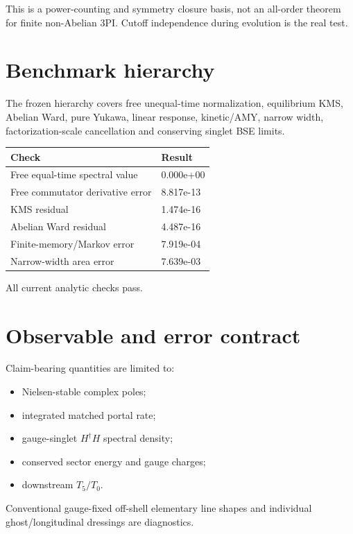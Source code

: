 \documentclass[
  10pt,
]{article}
\providecommand{\tightlist}{%
  \setlength{\itemsep}{0pt}\setlength{\parskip}{0pt}}
\begin{document}
This is a power-counting and symmetry closure basis, not an all-order
theorem for finite non-Abelian 3PI. Cutoff independence during evolution
is the real test.

\section{Benchmark hierarchy}\label{benchmark-hierarchy}

The frozen hierarchy covers free unequal-time normalization, equilibrium
KMS, Abelian Ward, pure Yukawa, linear response, kinetic/AMY, narrow
width, factorization-scale cancellation and conserving singlet BSE
limits.

\begin{longtable}[]{@{}ll@{}}
\toprule\noalign{}
Check & Result \\
\midrule\noalign{}
\endhead
\bottomrule\noalign{}
\endlastfoot
Free equal-time spectral value & 0.000e+00 \\
Free commutator derivative error & 8.817e-13 \\
KMS residual & 1.474e-16 \\
Abelian Ward residual & 4.487e-16 \\
Finite-memory/Markov error & 7.919e-04 \\
Narrow-width area error & 7.639e-03 \\
\end{longtable}

All current analytic checks pass.

\section{Observable and error
contract}\label{observable-and-error-contract}

Claim-bearing quantities are limited to:

\begin{itemize}
\tightlist
\item
  Nielsen-stable complex poles;
\item
  integrated matched portal rate;
\item
  gauge-singlet \(H^\dagger H\) spectral density;
\item
  conserved sector energy and gauge charges;
\item
  downstream \(T_5/T_0\).
\end{itemize}

Conventional gauge-fixed off-shell elementary line shapes and individual
ghost/longitudinal dressings are diagnostics.
\end{document}
